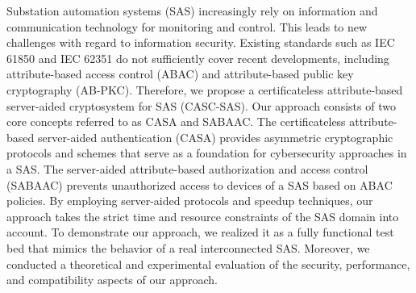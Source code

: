 \Abstract
Substation automation systems (SAS) increasingly rely on information and communication technology for monitoring and control.
This leads to new challenges with regard to information security.
Existing standards such as IEC 61850 and IEC 62351 do not sufficiently cover recent developments, including attribute-based access control (ABAC) and attribute-based public key cryptography (AB-PKC).
Therefore, we propose a certificateless attribute-based server-aided cryptosystem for SAS (CASC-SAS).
Our approach consists of two core concepts referred to as CASA and SABAAC.
The certificateless attribute-based server-aided authentication (CASA) provides asymmetric cryptographic protocols and schemes that serve as a foundation for cybersecurity approaches in a SAS.
The server-aided attribute-based authorization and access control (SABAAC) prevents unauthorized access to devices of a SAS based on ABAC policies.
By employing server-aided protocols and speedup techniques, our approach takes the strict time and resource constraints of the SAS domain into account.
To demonstrate our approach, we realized it as a fully functional test bed that mimics the behavior of a real interconnected SAS.
Moreover, we conducted a theoretical and experimental evaluation of the security, performance, and compatibility aspects of our approach.
